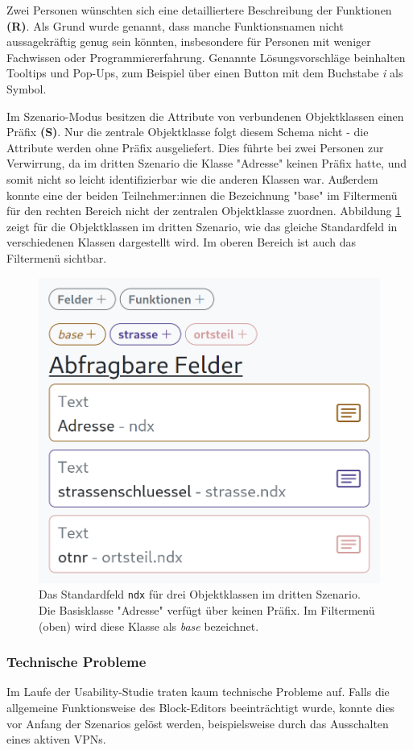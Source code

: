 \pskip
Zwei Personen wünschten sich eine detailliertere Beschreibung der Funktionen \textbf{(R)}. Als Grund wurde genannt, dass manche Funktionsnamen nicht aussagekräftig genug sein könnten, insbesondere für Personen mit weniger Fachwissen oder Programmiererfahrung. Genannte Lösungsvorschläge beinhalten Tooltips und Pop-Ups, zum Beispiel über einen Button mit dem Buchstabe \textit{i} als Symbol.

\pskip
Im Szenario-Modus besitzen die Attribute von verbundenen Objektklassen einen Präfix \textbf{(S)}. Nur die zentrale Objektklasse folgt diesem Schema nicht - die Attribute werden ohne Präfix ausgeliefert. Dies führte bei zwei Personen zur Verwirrung, da im dritten Szenario die Klasse "Adresse" keinen Präfix hatte, und somit nicht so leicht identifizierbar wie die anderen Klassen war. Außerdem konnte eine der beiden Teilnehmer:innen die Bezeichnung "base" im Filtermenü für den rechten Bereich nicht der zentralen Objektklasse zuordnen. Abbildung \ref{fig:scenario-prefixes} zeigt für die Objektklassen im dritten Szenario, wie das gleiche Standardfeld in verschiedenen Klassen dargestellt wird. Im oberen Bereich ist auch das Filtermenü sichtbar.

\begin{figure}[!ht]
  \centering
  \includegraphics[width=.6\textwidth]{assets/scenario-prefixes.png}
  \caption[Darstellung des Standardfeldes \texttt{ndx} für drei Objektklassen im dritten Szenario]{Das Standardfeld \texttt{ndx} für drei Objektklassen im dritten Szenario. Die Basisklasse "Adresse" verfügt über keinen Präfix. Im Filtermenü (oben) wird diese Klasse als \textit{base} bezeichnet.}
  \label{fig:scenario-prefixes}
\end{figure}

\subsubsection{Technische Probleme}
Im Laufe der Usability-Studie traten kaum technische Probleme auf. Falls die allgemeine Funktionsweise des Block-Editors beeinträchtigt wurde, konnte dies vor Anfang der Szenarios gelöst werden, beispielsweise durch das Ausschalten eines aktiven \acp{VPN}.

